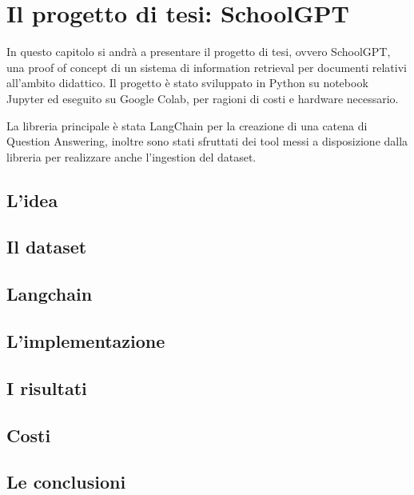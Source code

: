 \chapter{Il progetto di tesi: SchoolGPT}
In questo capitolo si andrà a presentare il progetto di tesi, ovvero SchoolGPT, una proof of concept di un sistema di information retrieval per documenti relativi all'ambito didattico.
Il progetto è stato sviluppato in Python su notebook Jupyter ed eseguito su Google Colab, per ragioni di costi e hardware necessario. 

La libreria principale è stata LangChain per la creazione di una catena di Question Answering, inoltre sono stati sfruttati dei tool messi a disposizione dalla libreria per realizzare anche l'ingestion del dataset.
\section{L'idea}

\section{Il dataset}

\section{Langchain}

\section{L'implementazione}

\section{I risultati}
\section{Costi}

\section{Le conclusioni}